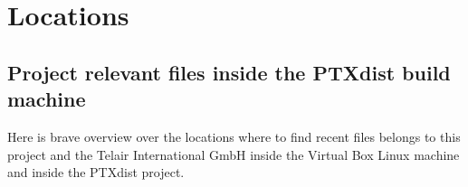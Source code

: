 \chapter{Locations}%
\label{cha:locations}

\section{Project relevant files inside the PTXdist build machine}%
\label{sec:Where to find project relevant files inside the PTXdist build machine}



Here is brave overview over the locations where to find recent files belongs to
this project and the Telair International GmbH inside the Virtual Box Linux
machine and inside the PTXdist project. \\

